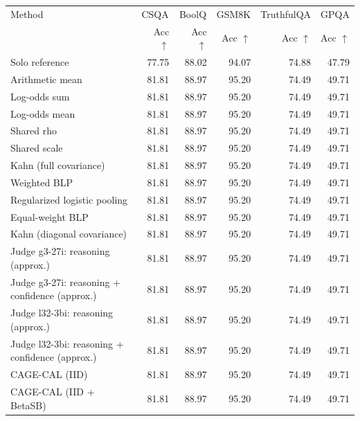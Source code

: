 \begin{tabular}{lrrrrr}
\toprule
Method & \multicolumn{1}{c}{CSQA} & \multicolumn{1}{c}{BoolQ} & \multicolumn{1}{c}{GSM8K} & \multicolumn{1}{c}{TruthfulQA} & \multicolumn{1}{c}{GPQA} \\
 & Acc $\uparrow$ & Acc $\uparrow$ & Acc $\uparrow$ & Acc $\uparrow$ & Acc $\uparrow$ \\
\midrule
Solo reference & 77.75 & 88.02 & 94.07 & 74.88 & 47.79 \\
Arithmetic mean & 81.81 & 88.97 & 95.20 & 74.49 & 49.71 \\
Log-odds sum & 81.81 & 88.97 & 95.20 & 74.49 & 49.71 \\
Log-odds mean & 81.81 & 88.97 & 95.20 & 74.49 & 49.71 \\
Shared rho & 81.81 & 88.97 & 95.20 & 74.49 & 49.71 \\
Shared scale & 81.81 & 88.97 & 95.20 & 74.49 & 49.71 \\
Kahn (full covariance) & 81.81 & 88.97 & 95.20 & 74.49 & 49.71 \\
Weighted BLP & 81.81 & 88.97 & 95.20 & 74.49 & 49.71 \\
Regularized logistic pooling & 81.81 & 88.97 & 95.20 & 74.49 & 49.71 \\
Equal-weight BLP & 81.81 & 88.97 & 95.20 & 74.49 & 49.71 \\
Kahn (diagonal covariance) & 81.81 & 88.97 & 95.20 & 74.49 & 49.71 \\
Judge g3-27i: reasoning (approx.) & 81.81 & 88.97 & 95.20 & 74.49 & 49.71 \\
Judge g3-27i: reasoning + confidence (approx.) & 81.81 & 88.97 & 95.20 & 74.49 & 49.71 \\
Judge l32-3bi: reasoning (approx.) & 81.81 & 88.97 & 95.20 & 74.49 & 49.71 \\
Judge l32-3bi: reasoning + confidence (approx.) & 81.81 & 88.97 & 95.20 & 74.49 & 49.71 \\
CAGE-CAL (IID) & 81.81 & 88.97 & 95.20 & 74.49 & 49.71 \\
CAGE-CAL (IID + BetaSB) & 81.81 & 88.97 & 95.20 & 74.49 & 49.71 \\
\bottomrule
\end{tabular}
